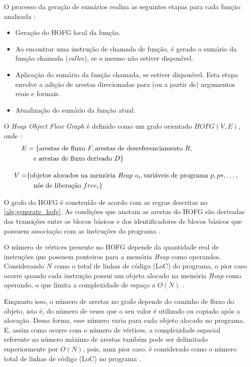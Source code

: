 \documentclass[
    12pt,                %
    openright,           %
    oneside,             %
    a4paper,             %
    english,             %
    brazil               %
]{abntex2}
\begin{document}
\begin{samepage}
    O processo da geração de sumários realiza as seguintes etapas para cada função analisada \cite{MadhavC2023}:
    \begin{itemize}
    \item Geração do HOFG local da função.
    \item Ao encontrar uma instrução de chamada de função, é gerado o sumário da função chamada (\textit{callee}), se o mesmo não estiver disponível.
    \item Aplicação do sumário da função chamada, se estiver disponível. Esta etapa envolve a adição de arestas direcionadas para (ou a partir de) argumentos reais e formais.
    \item Atualização do sumário da função atual.
    \end{itemize}
\end{samepage}

O \textit{Heap Object Flow Graph} é definido como um grafo orientado $HOFG(V, E)$, onde \cite{MadhavC2023}:
\begin{align}
    E &= \{ \text{arestas de fluxo } F, \text{arestas de desreferenciamento } R, \nonumber \\ &\quad \text{e arestas de fluxo derivado } D \} \\[1em]
    V =& \{ \text{objetos alocados na memória \textit{Heap} } o_i, \text{variáveis de programa } p, p*, \dots, \nonumber \\ &\quad \text{nós de liberação } free_i \}
\end{align}

O grafo do HOFG é construído de acordo com as regras descritas no \ref{alg:generate_hofg}. As condições que anotam as arestas do HOFG são derivadas das transições entre os blocos básicos e dos identificadores de blocos básicos que possuem associação com as instruções do programa \cite{MadhavC2023}.
\par 
O número de vértices presente no HOFG depende da quantidade real de instruções que possuem ponteiros para a memória \textit{Heap} como operandos. Considerando $N$ como o total de linhas de código (LoC) do programa, o pior caso ocorre quando cada instrução possui um objeto alocado na memória \textit{Heap} como operando, 
o que limita a complexidade de espaço a $O(N)$ \cite{MadhavC2023}.
\par
Enquanto isso, o número de arestas no grafo depende do caminho de fluxo do objeto, isto é, do número de vezes que o seu valor é utilizado ou copiado após a alocação. Dessa forma, esse número varia para cada objeto alocado no programa. E, assim como ocorre com o número de vértices, a complexidade espacial referente ao 
número máximo de arestas também pode ser delimitado superiormente por $O(N)$, pois, num pior caso, é considerado como o número total de linhas de código (LoC) no programa \cite{MadhavC2023}.
\end{document}

